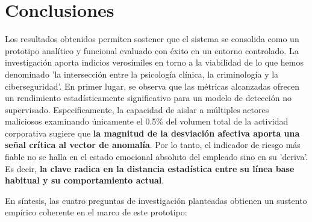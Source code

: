 \documentclass[IB]{TFUOC}%
\begin{document}
\section{Conclusiones}
Los resultados obtenidos permiten sostener que el sistema se consolida como un prototipo analítico y funcional evaluado con éxito en un entorno controlado. La investigación aporta indicios verosímiles en torno a la viabilidad de lo que hemos denominado 'la intersección entre la psicología clínica, la criminología y la ciberseguridad'. En primer lugar, se observa que las métricas alcanzadas ofrecen un rendimiento estadísticamente significativo para un modelo de detección no supervisado. Especificamente, la capacidad de aislar a múltiples actores maliciosos examinando únicamente el 0.5\% del volumen total de la actividad corporativa sugiere que \textbf{la magnitud de la desviación afectiva aporta una señal crítica al vector de anomalía}. Por lo tanto, el indicador de riesgo más fiable no se halla en el estado emocional absoluto del empleado sino en su 'deriva'. Es decir, \textbf{la clave radica en la distancia estadística entre su línea base habitual y su comportamiento actual}.

\medskip
\noindent En síntesis, las cuatro preguntas de investigación planteadas obtienen un sustento empírico coherente en el marco de este prototipo:
\end{document}
